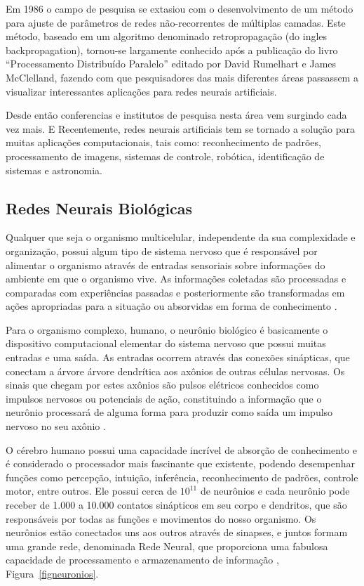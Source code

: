 Em 1986 o campo de pesquisa se extasiou com o desenvolvimento de um método para ajuste de parâmetros de redes não-recorrentes de múltiplas camadas. Este método, baseado em um algoritmo denominado retropropagação (do ingles backpropagation), tornou-se largamente conhecido após a publicação do livro “Processamento Distribuído Paralelo” editado por David Rumelhart e James McClelland, fazendo com que pesquisadores das mais diferentes áreas passassem a visualizar interessantes aplicações para redes neurais artificiais.

Desde então conferencias e institutos de pesquisa nesta área vem surgindo cada vez mais. E Recentemente, redes neurais artificiais tem se tornado a solução para muitas aplicações computacionais, tais como: reconhecimento de padrões, processamento de imagens, sistemas de controle, robótica, identificação de sistemas e astronomia.

\subsection{Redes Neurais Biológicas}

Qualquer que seja o organismo multicelular, independente da sua
complexidade e organização, possui algum tipo de sistema nervoso que é responsável
por alimentar o organismo através de entradas sensoriais sobre informações do
ambiente em que o organismo vive. As informações coletadas são processadas e
comparadas com experiências passadas e posteriormente são transformadas em
ações apropriadas para a situação ou absorvidas em forma de conhecimento \cite{haykin1994neural}.

Para o organismo complexo, humano, o neurônio biológico é basicamente o dispositivo computacional elementar do sistema nervoso que possui muitas entradas e uma saída. As entradas ocorrem através das conexões sinápticas, que conectam a árvore árvore dendrítica aos axônios de outras células nervosas. Os sinais que chegam por estes axônios são pulsos elétricos conhecidos como impulsos nervosos ou potenciais de ação, constituindo a informação que o neurônio processará de alguma forma para produzir como saída um impulso nervoso no seu axônio \cite{kovacs1996redes}. 

O cérebro humano possui uma capacidade incrível de absorção de conhecimento e é considerado o processador mais fascinante que existente, podendo desempenhar funções como percepção, intuição, inferência, reconhecimento de padrões, controle motor, entre outros. Ele possui cerca de $10^{11}$ de neurônios e cada neurônio pode receber de 1.000 a 10.000 contatos sinápticos em seu corpo e dendritos, que são responsáveis por todas as funções e movimentos do nosso organismo. Os neurônios estão conectados uns aos outros através de sinapses, e juntos formam uma grande rede, denominada Rede Neural, que proporciona uma fabulosa capacidade de processamento e armazenamento de informação \cite{kovacs1996redes}, Figura~\ref{figneuronios}. 

